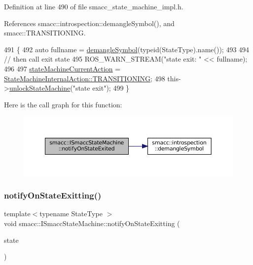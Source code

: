 Definition at line 490 of file smacc\+\_\+state\+\_\+machine\+\_\+impl.\+h.



References smacc\+::introspection\+::demangle\+Symbol(), and smacc\+::\+T\+R\+A\+N\+S\+I\+T\+I\+O\+N\+I\+NG.


\begin{DoxyCode}
491   \{
492     \textcolor{keyword}{auto} fullname = \hyperlink{namespacesmacc_1_1introspection_a2f495108db3e57604d8d3ff5ef030302}{demangleSymbol}(\textcolor{keyword}{typeid}(StateType).name());
493 
494     \textcolor{comment}{// then call exit state}
495     ROS\_WARN\_STREAM(\textcolor{stringliteral}{"state exit: "} << fullname);
496 
497     \hyperlink{classsmacc_1_1ISmaccStateMachine_a654a98ba86c4c1013ac3c371f293d950}{stateMachineCurrentAction} = 
      \hyperlink{namespacesmacc_a0889aff43c93fe5285109819d2898144a5e174e130ee1847f37541ba5786207a3}{StateMachineInternalAction::TRANSITIONING};
498     this->\hyperlink{classsmacc_1_1ISmaccStateMachine_ae2e3ceb87bfe3f9d8bf320e36071fdc7}{unlockStateMachine}(\textcolor{stringliteral}{"state exit"});
499   \}
\end{DoxyCode}
Here is the call graph for this function\+:
\nopagebreak
\begin{figure}[H]
\begin{center}
\leavevmode
\includegraphics[width=350pt]{classsmacc_1_1ISmaccStateMachine_ac352013a5df0dcce0594f1466b9a6f7b_cgraph}
\end{center}
\end{figure}
\mbox{\label{classsmacc_1_1ISmaccStateMachine_a707c36f8b02eeed1af624dd36a5a4957}} 
\subsubsection{\texorpdfstring{notify\+On\+State\+Exitting()}{notifyOnStateExitting()}}
{\footnotesize\ttfamily template$<$typename State\+Type $>$ \\
void smacc\+::\+I\+Smacc\+State\+Machine\+::notify\+On\+State\+Exitting (\begin{DoxyParamCaption}\item[{State\+Type $\ast$}]{state }\end{DoxyParamCaption})}



